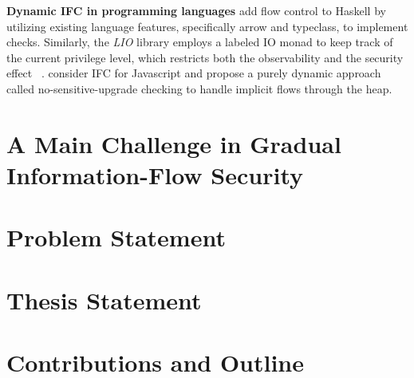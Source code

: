 \textbf{Dynamic IFC in programming languages}
\textcite{li2006encoding,LI20101974} add flow control to Haskell by utilizing
existing language features, specifically arrow and typeclass,
to implement checks. Similarly, the \textit{LIO} library employs
a labeled IO monad to keep track of the current privilege level,
which restricts both the observability and the security effect
~\parencite{stefan2011flexible,stefan2012flexible}.
\textcite{austin2009efficient} consider IFC for Javascript and
propose a purely dynamic approach called no-sensitive-upgrade
checking to handle implicit flows through the heap.

\textbf{}

\section{A Main Challenge in Gradual Information-Flow Security}

\section{Problem Statement}

\section{Thesis Statement}

\section{Contributions and Outline}
